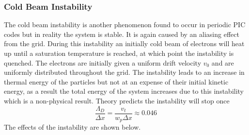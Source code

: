 \documentclass[12pt]{article}
\def\be{\begin{equation}}
\def\ee{\end{equation}}
\begin{document}
\subsubsection{Cold Beam Instability} 
The cold beam instability is another phenomenon found to occur in periodic PIC codes but in reality the system is stable. It is again caused by an aliasing effect from the grid. During this instability an initially cold beam of electrons will heat up until a saturation temperature is reached, at which point the instability is quenched.  The electrons are initially given a uniform drift velocity $v_0$ and are uniformly distributed throughout the grid. The instability leads to an increase in thermal energy of the particles but not at an expense of their initial kinetic energy, as a result the total energy of the system increases due to this instability which is a non-physical result. Theory predicts the instability will stop once 
\be 
\frac{\Lambda_D }{\Delta x} = \frac{v_t}{w_p \Delta x} \approx 0.046
\label{eq:cold_beam}
\ee 
The effects of the instability are shown below. 
\end{document}
